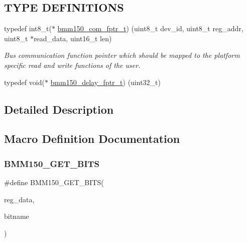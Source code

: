 \subsection*{T\+Y\+PE D\+E\+F\+I\+N\+I\+T\+I\+O\+NS}
\begin{DoxyCompactItemize}
\item 
\mbox{\label{group___b_m_m150_ga87d06d3b9c2af4c76c4dea09b06ebe11}} 
typedef int8\+\_\+t($\ast$ \hyperlink{group___b_m_m150_ga87d06d3b9c2af4c76c4dea09b06ebe11}{bmm150\+\_\+com\+\_\+fptr\+\_\+t}) (uint8\+\_\+t dev\+\_\+id, uint8\+\_\+t reg\+\_\+addr, uint8\+\_\+t $\ast$read\+\_\+data, uint16\+\_\+t len)
\begin{DoxyCompactList}\small\item\em Bus communication function pointer which should be mapped to the platform specific read and write functions of the user. \end{DoxyCompactList}\item 
typedef void($\ast$ \hyperlink{group___b_m_m150_ga529b0dd2bf61b40fd771adfee5c78beb}{bmm150\+\_\+delay\+\_\+fptr\+\_\+t}) (uint32\+\_\+t)
\end{DoxyCompactItemize}


\subsection{Detailed Description}


\subsection{Macro Definition Documentation}
\mbox{\label{group___b_m_m150_ga1a1f0cdb09dd61a91f387f93157311c4}} 
\subsubsection{\texorpdfstring{B\+M\+M150\+\_\+\+G\+E\+T\+\_\+\+B\+I\+TS}{BMM150\_GET\_BITS}}
{\footnotesize\ttfamily \#define B\+M\+M150\+\_\+\+G\+E\+T\+\_\+\+B\+I\+TS(\begin{DoxyParamCaption}\item[{}]{reg\+\_\+data,  }\item[{}]{bitname }\end{DoxyParamCaption})}

